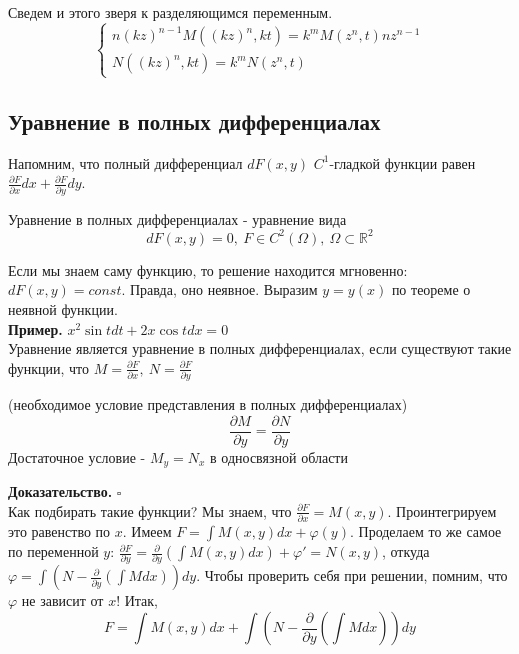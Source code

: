 Сведем и этого зверя к разделяющимся переменным. 
$$\begin{cases}
    n(kz)^{n-1}M((kz)^n,kt)=k^mM(z^n,t)nz^{n-1}\\
    N((kz)^n,kt)=k^mN(z^n,t)
\end{cases}$$ 

\subsection{Уравнение в полных дифференциалах}
Напомним, что полный дифференциал $dF(x,y)$  $C^1$-гладкой функции
равен  $\frac{\partial F}{\partial x} dx+\frac{\partial F}{\partial y}dy$.
\begin{defin}
Уравнение в полных дифференциалах - уравнение вида
$$dF(x,y)=0,~F\in C^2(\Omega),~\Omega\subset \mathbb{R}^2$$
\end{defin}
Если мы знаем саму функцию, то решение находится мгновенно: $dF(x,y)=const$.
Правда, оно неявное. Выразим  $y=y(x)$ по теореме о неявной функции.\\
\textbf{Пример.} $x^2\sin{t}dt+2x\cos{t}dx=0$\\
Уравнение является уравнение в полных дифференциалах, если существуют такие
функции, что $M=\frac{\partial F}{\partial x},~N=\frac{\partial F}{\partial y}$
\begin{theor}
    (необходимое условие представления в полных дифференциалах)\\
    $$\frac{\partial M}{\partial y}=\frac{\partial N}{\partial y}$$ 
    Достаточное условие - $M_y=N_x$ в односвязной области
\end{theor}
\textbf{Доказательство.} $\square$ \\
Как подбирать такие функции? Мы знаем, что $\frac{\partial F}{\partial x}=
M(x,y)$. Проинтегрируем это равенство по $x$. Имеем  $F=\int M(x,y)dx+
\varphi(y)$. Проделаем то же самое по переменной $y$:  $\frac{\partial F}
{\partial y}=\frac{\partial }{\partial y}(\int M(x,y)dx)+\varphi'=N(x,y)$,
откуда $\varphi=\int\left(N-\frac{\partial }{\partial y}(\int Mdx) \right)dy$.
Чтобы проверить себя при решении, помним, что $\varphi$ не зависит от $x$!
Итак,
$$F=\int M(x,y)dx+\int\left(N-\frac{\partial }{\partial y}\left(\int Mdx
\right)\right)dy$$
